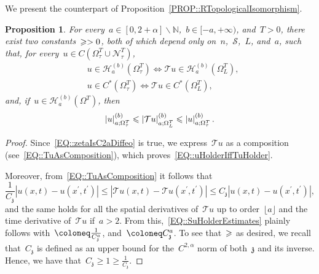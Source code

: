 \documentclass[12pt,a4paper]{amsart}
\makeatletter
\numberwithin{equation}{section}
\newtheorem{proposition}[theorem]{Proposition}
\theoremstyle{definition}
\theoremstyle{remark}
\newcommand{\N}{\mathbb{N}}
\newcommand{\abs}[1]{\left\lvert#1\right\rvert}
\renewcommand{\leq}{\leqslant}
\renewcommand{\geq}{\geqslant}
\newcommand{\const}[1]{%
  \csname const@#1\endcsname%
}
\makeatother
\begin{document}
We present the counterpart of Proposition~\ref{PROP::RTopologicalIsomorphism}.
\begin{proposition}\label{PROP::TTopologicalIsomorphism}
    For every~$a \in [0,2+\alpha] \smallsetminus \N$,~$b\in [-a,+\infty)$, and~$T>0$, there exist two constants~$\const{CONST::TTopologicalIsomorphismUpper} \geq \const{CONST::TTopologicalIsomorphismLower} > 0$, both of which depend only on~$n$,~$\mathcal{S}$,~$L$, and~$a$, such that, for every~$u \in C(\Omega_\tau^T \cup \mathcal{N}_\tau^T)$, %
    \begin{align}
            \label{EQ::uHolderIffTuHolder}&u \in \mathcal{H}_a^{(b)}(\Omega_\tau^T) \iff \mathcal{T}u \in \mathcal{H}_a^{(b)}(\Omega_L^T),\\
            \label{EQ::uCastIffTuCast}&u \in C^\ast(\Omega_\tau^T) \iff \mathcal{T}u \in C^\ast(\Omega_L^T),
    \end{align}
    and, if~$u \in \mathcal{H}_a^{(b)}(\Omega^T)$, then
    \begin{equation}\label{EQ::SuHolderEstimates}
        \const{CONST::TTopologicalIsomorphismLower}\abs{u}_{a; \Omega_\tau^T}^{(b)} \leq \abs{\mathcal{T}u}_{a; \Omega_L^T}^{(b)} \leq \const{CONST::TTopologicalIsomorphismUpper}\abs{u}_{a; \Omega_\tau^T}^{(b)}.
    \end{equation}
\end{proposition}

\begin{proof}
    Since~\eqref{EQ::zetaIsC2aDiffeo} is true, we express~$\mathcal{T}u$ as a composition (see~\eqref{EQ::TuAsComposition}), which proves~\eqref{EQ::uHolderIffTuHolder}.

    Moreover, from~\eqref{EQ::TuAsComposition} it follows that
    \begin{equation}
        \frac{1}{C_\mathfrak{z}} \abs{u(x,t)-u(x^\prime,t^\prime)} \leq \abs{\mathcal{T}u(x,t)-\mathcal{T}u(x^\prime, t^\prime)} \leq C_\mathfrak{z} \abs{u(x,t)-u(x^\prime,t^\prime)},
    \end{equation}
    and the same holds for all the spatial derivatives of~$\mathcal{T}u$ up to order~$\lfloor a \rfloor$ and the time derivative of~$\mathcal{T}u$ if~$a > 2$. From this,~\eqref{EQ::SuHolderEstimates} plainly follows with~$\const{CONST::TTopologicalIsomorphismLower} \coloneq \frac{1}{C_\mathfrak{z}^a}$, and~$\const{CONST::TTopologicalIsomorphismUpper} \coloneq C_\mathfrak{z}^a$. To see that~$\const{CONST::TTopologicalIsomorphismUpper}\geq \const{CONST::TTopologicalIsomorphismLower}$ as desired, we recall that~$C_\mathfrak{z}$ is defined as an upper bound for the~$C^{2,\alpha}$ norm of both~$\mathfrak{z}$ and its inverse. Hence, we have that~$C_\mathfrak{z} \geq 1 \geq \frac{1}{C_\mathfrak{z}}$.
\end{proof}
\end{document}
